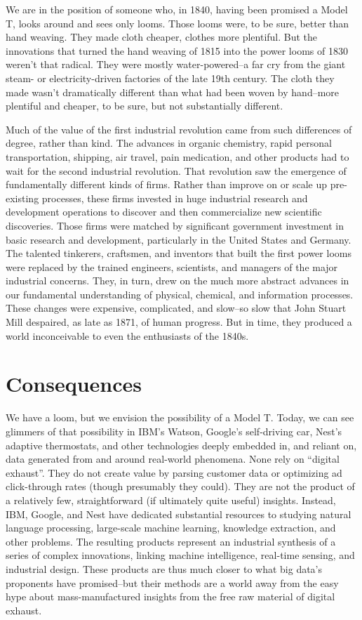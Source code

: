 \documentclass[12pt]{article}
\begin{document}
We are in the position of someone who, in 1840, having been promised a
Model T, looks around and sees only looms. Those looms were, to be
sure, better than hand weaving. They made cloth cheaper, clothes more
plentiful. But the innovations that turned the hand weaving of
1815 into the power looms of 1830 weren't that radical. They were
mostly water-powered--a far cry from the giant steam- or
electricity-driven factories of the late 19th century. The cloth they
made wasn't dramatically different than what had been woven by
hand--more plentiful and cheaper, to be sure, but not substantially
different.  

Much of the value of the first industrial revolution came from such
differences of degree, rather than kind. The advances in organic
chemistry, rapid personal transportation, shipping, air travel, pain
medication, and other products had to wait for the second industrial
revolution. That revolution saw the emergence of fundamentally
different kinds of firms. Rather than improve on or scale up pre-existing
processes, these firms invested in huge industrial research and
development operations to discover and then commercialize new
scientific discoveries. Those firms were matched by significant
government investment in basic research and development, particularly
in the United States and Germany. The talented tinkerers, craftsmen,
and inventors that built the first power looms were replaced by the
trained engineers, scientists, and managers of the major industrial
concerns. They, in turn, drew on the much more abstract
advances in our fundamental understanding of physical, chemical, and
information processes. These changes were expensive, complicated, and
slow--so slow that John Stuart Mill despaired, as late as 1871, of
human progress. But in time, they produced a world inconceivable to
even the enthusiasts of the 1840s. 


\section{Consequences}
\label{sec:consequences}

We have a loom, but we envision the possibility of a Model T. Today,
we can see glimmers of that possibility in IBM's Watson, Google's
self-driving car, Nest's adaptive thermostats, and other technologies
deeply embedded in, and reliant on, data generated from and around
real-world phenomena. None rely on ``digital exhaust''. They do not
create value by parsing customer data or optimizing ad click-through
rates (though presumably they could). They are not the product of a
relatively few, straightforward (if ultimately quite useful)
insights. Instead, IBM, Google, and Nest have dedicated substantial
resources to studying natural language processing, large-scale machine
learning, knowledge extraction, and other problems. The resulting
products represent an industrial synthesis of a series of complex
innovations, linking machine intelligence, real-time sensing, and
industrial design. These products are thus much closer to what big
data's proponents have promised--but their methods are a world away
from the easy hype about mass-manufactured insights from the free raw
material of digital exhaust.
\end{document}
